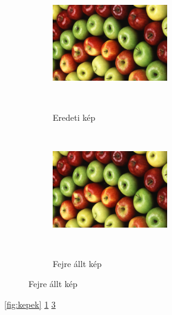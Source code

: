 \documentclass{article}
\begin{document}
\listoffigures

\hulipsum[3]
\begin{figure}

\caption{Almák}
\label{fig:kepek}
\begin{subfigure}[c]{5cm}
\caption{Eredeti kép}
\includegraphics[height=5cm, width=5cm, keepaspectratio]{alma}
\label{fig:eredeti}
\end{subfigure}

\begin{subfigure}[c]{5cm}
\caption{Fejre állt kép}
\includegraphics[angle=180, origin=c, height=5cm, width=5cm, keepaspectratio]{alma}
\label{fig:fejenallo}
\end{subfigure}

\end{figure}
\hulipsum

\ref{fig:kepek}
\ref{fig:eredeti}
\ref{fig:fejenallo}

\end{document}
